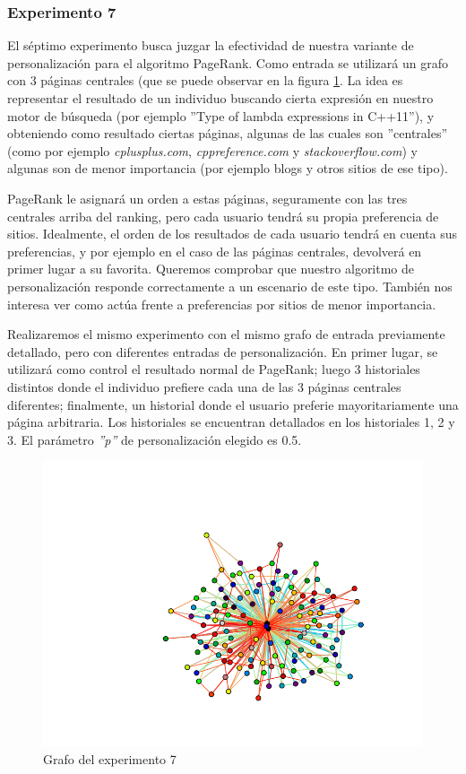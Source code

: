 \subsubsection{Experimento 7}
\par El s\'eptimo experimento busca juzgar la efectividad de nuestra variante de personalizaci\'on para el algoritmo PageRank.
Como entrada se utilizar\'a un grafo con 3 p\'aginas centrales (que se puede observar en la figura \ref{fig:grafo7}.
La idea es representar el resultado de un individuo buscando cierta expresi\'on en nuestro motor de b\'usqueda (por ejemplo ''Type of lambda expressions in C++11''),
y obteniendo como resultado ciertas p\'aginas, algunas de las cuales son ''centrales'' (como por ejemplo \textit{cplusplus.com}, \textit{cppreference.com} y \textit{stackoverflow.com})
y algunas son de menor importancia (por ejemplo blogs y otros sitios de ese tipo).
\par PageRank le asignar\'a un orden a estas p\'aginas, seguramente con las tres centrales arriba del ranking, pero cada usuario tendr\'a su propia preferencia de sitios.
Idealmente, el orden de los resultados de cada usuario tendr\'a en cuenta sus preferencias, y por ejemplo en el caso de las p\'aginas centrales, devolver\'a en primer lugar a su favorita.
Queremos comprobar que nuestro algoritmo de personalizaci\'on responde correctamente a un escenario de este tipo. 
Tambi\'en nos interesa ver como act\'ua frente a preferencias por sitios de menor importancia.
\par Realizaremos el mismo experimento con el mismo grafo de entrada previamente detallado, pero con diferentes entradas de personalizaci\'on.
En primer lugar, se utilizar\'a como control el resultado normal de PageRank; luego 3 historiales distintos donde el individuo prefiere cada una de las 3 p\'aginas centrales diferentes;
finalmente, un historial donde el usuario preferie mayoritariamente una p\'agina arbitraria.
Los historiales se encuentran detallados en los historiales 1, 2 y 3.
El par\'ametro \textit{''p''} de personalizaci\'on elegido es 0.5.

\FloatBarrier
\begin{figure}[ht]
\begin{center}
\includegraphics[width=0.8\columnwidth]{imagenes/exp7}
\caption{Grafo del experimento 7}
\label{fig:grafo7}
\end{center}
\end{figure}


